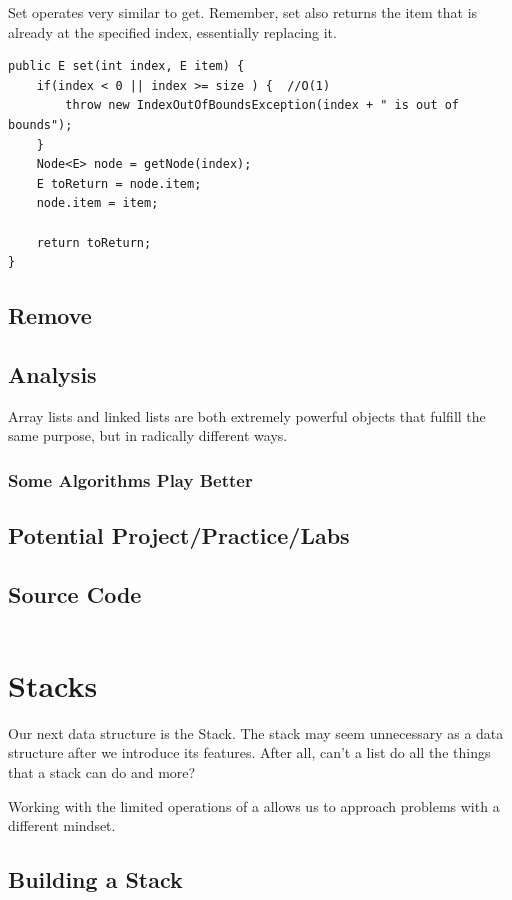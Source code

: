 \documentclass[10pt,a4paper]{book}
\begin{document}
Set operates very similar to get.  Remember, set also returns the item that is already at the specified index, essentially replacing it.

\begin{verbatim}
public E set(int index, E item) {
	if(index < 0 || index >= size ) {  //O(1)
		throw new IndexOutOfBoundsException(index + " is out of bounds");
	}
	Node<E> node = getNode(index);
	E toReturn = node.item;
	node.item = item;
	
	return toReturn;
}
\end{verbatim}


\section{Remove}




\section{Analysis}
Array lists and linked lists are both extremely powerful objects that fulfill  the same purpose, but in radically different ways. 




\subsection{Some Algorithms Play Better}

\section{Potential Project/Practice/Labs}

\section{Source Code}
\inputminted{python3}{code/linkedlist.py}


\chapter{Stacks}
Our next data structure is the Stack.
The stack may seem unnecessary as a data structure after we introduce its features.  
After all, can't a list do all the things that a stack can do and more? 

Working with the limited operations of a allows us to approach problems with a different mindset.

\section{Building a Stack}
\end{document}

